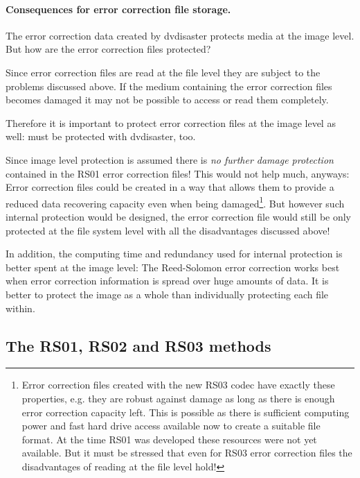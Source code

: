 \paragraph{Consequences for error correction file storage.} \label{background-image-level-consequences}The error correction data 
created by dvdisaster protects media at the image level. But how are the error correction 
files protected?

\smallskip

Since error correction files are read at the file level they are subject to the 
problems discussed above. If the medium containing the error correction files 
becomes damaged it may not be possible to access or read them completely.

Therefore it is important to protect error correction files at the image level as 
well:  must be 
protected with dvdisaster, too.

Since image level protection is assumed there is {\em no further damage protection}
contained in the RS01 error correction files! This would not help much, anyways: 
Error correction files could be created in a way that allows them to provide a 
reduced data recovering capacity even when being damaged\footnote{Error correction files 
created with the new RS03 codec have exactly these properties, e.g. they are robust 
against damage as long as there is enough error correction capacity left. This is 
possible as there is sufficient computing power and fast hard drive access available 
now to create a suitable file format. At the time RS01 was developed these resources 
were not yet available. But it must be stressed that even for RS03 error correction 
files the disadvantages of reading at the file level hold!}. But 
however such internal protection would be designed, the error correction file would 
still be only protected at the file system level with all the disadvantages discussed above!

In addition, the computing time and redundancy used for internal protection is 
better spent at the image level: The Reed-Solomon error correction works best
 when error correction information is spread over huge amounts of data. It is 
better to protect the image as a whole than individually protecting each file within.

 
\subsection{The RS01, RS02 and RS03 methods}
\label{background-methods}

